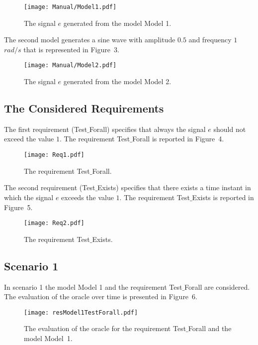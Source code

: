 \documentclass[12pt]{extarticle}
\newcommand{\<}{\langle}
\renewcommand{\>}{\rangle}
\theoremstyle{definition}
\begin{document}
\begin{figure}[h]
\caption{The signal $e$ generated from the model Model 1.}
  \centering
    \texttt{[image: Manual/Model1.pdf]}
\end{figure}

\noindent The second model generates a sine wave with amplitude $0.5$ and frequency $1$ $rad/s$ that is represented in Figure~3.

\begin{figure}[h]
\caption{The signal $e$ generated from the model Model 2.}
  \centering
    \texttt{[image: Manual/Model2.pdf]}
\end{figure}

\subsection{The Considered Requirements}
The first requirement (Test$\_$Forall) specifies that always the signal $e$ should not exceed the value $1$.
The requirement  Test$\_$Forall is reported in Figure~4.

\begin{figure}[h]
\caption{The requirement Test$\_$Forall.}
  \centering
    \texttt{[image: Req1.pdf]}
\end{figure}

\noindent The second requirement (Test$\_$Exists) specifies that there exists a time instant in which the signal $e$  exceeds the value $1$.
The requirement  Test$\_$Exists is reported in Figure~5.

\begin{figure}[h]
\caption{The requirement  Test$\_$Exists.}
  \centering
    \texttt{[image: Req2.pdf]}
\end{figure}

\clearpage

\subsection{Scenario 1}
In scenario 1 the model Model 1 and the requirement Test$\_$Forall are considered. 
The evaluation of the oracle over time is presented in Figure~6.

\begin{figure}[h]
\caption{The evaluation of the oracle for the requirement Test$\_$Forall  and the model Model~1.}
  \centering
    \texttt{[image: resModel1TestForall.pdf]}
\end{figure}
\end{document}
